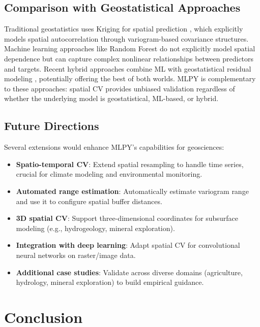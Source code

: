 \documentclass[a4paper,fleqn]{cas-sc}
\begin{document}
\subsection{Comparison with Geostatistical Approaches}

Traditional geostatistics uses Kriging for spatial prediction \citep{cressie1990origins}, which explicitly models spatial autocorrelation through variogram-based covariance structures. Machine learning approaches like Random Forest do not explicitly model spatial dependence but can capture complex nonlinear relationships between predictors and targets. Recent hybrid approaches combine ML with geostatistical residual modeling \citep{hengl2018random}, potentially offering the best of both worlds. MLPY is complementary to these approaches: spatial CV provides unbiased validation regardless of whether the underlying model is geostatistical, ML-based, or hybrid.

\subsection{Future Directions}

Several extensions would enhance MLPY's capabilities for geosciences:

\begin{itemize}
\item \textbf{Spatio-temporal CV}: Extend spatial resampling to handle time series, crucial for climate modeling and environmental monitoring.
\item \textbf{Automated range estimation}: Automatically estimate variogram range and use it to configure spatial buffer distances.
\item \textbf{3D spatial CV}: Support three-dimensional coordinates for subsurface modeling (e.g., hydrogeology, mineral exploration).
\item \textbf{Integration with deep learning}: Adapt spatial CV for convolutional neural networks on raster/image data.
\item \textbf{Additional case studies}: Validate across diverse domains (agriculture, hydrology, mineral exploration) to build empirical guidance.
\end{itemize}


\section{Conclusion}
\label{sec:conclusion}
\end{document}
